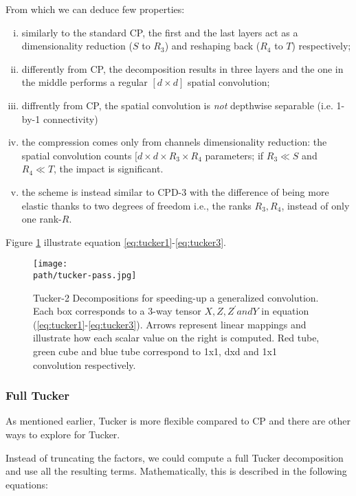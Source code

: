 From which we can deduce few properties: 
\begin{enumerate}[(i)]
	\item similarly to the standard CP, the first and the last layers act as a dimensionality reduction ($S $ to $R_3$) and reshaping back ($R_4$ to $T$) respectively; 
	
	\item differently from CP, the decomposition results in three layers and the one in the middle performs a regular $[d \times d]$ spatial convolution; 
	
	\item diffrently from CP, the spatial convolution is \emph{not} depthwise separable (i.e. 1-by-1 connectivity) 
	
	\item the compression comes only from channels dimensionality reduction: the spatial convolution counts $[d \times d \times R_3 \times R_4$ parameters; if $R_3 \ll S$ and $R_4 \ll T$, the impact is significant. 
	
	\item the scheme is instead similar to CPD-3 with the difference of being more elastic thanks to two degrees of freedom i.e., the ranks $R_3, R_4$, instead of only one rank-$R$.
\end{enumerate}

Figure \ref{fig:tucker-pass} illustrate equation \ref{eq:tucker1}-\ref{eq:tucker3}. 

\begin{figure}[h!]
 \centering
 \texttt{[image: \\path/tucker-pass.jpg]} 
 \caption{Tucker-2  Decompositions  for  speeding-up  a generalized convolution. Each box corresponds to a 3-way tensor $X, Z, Z^' and Y$ in equation (\ref{eq:tucker1}-\ref{eq:tucker3}). Arrows represent linear mappings and illustrate how each scalar value on the right is computed. Red tube, green cube and blue tube correspond to 1x1, dxd and 1x1 convolution respectively.}
 \label{fig:tucker-pass}
\end{figure}

\newpage 
\subsubsection{Full Tucker}
As mentioned earlier, Tucker is more flexible compared to CP and there are other ways to explore for Tucker. 

Instead of truncating the factors, we could compute a full Tucker decomposition and use all the resulting terms. Mathematically, this is described in the following equations:  


